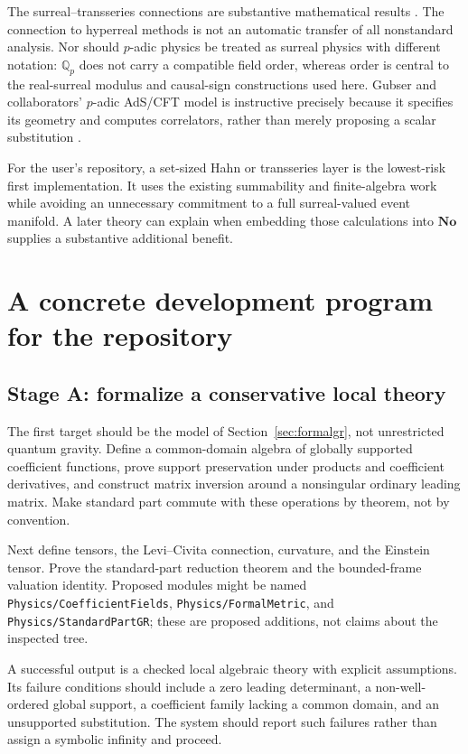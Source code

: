 \documentclass[11pt,a4paper]{article}
\numberwithin{equation}{section}
\theoremstyle{definition}
\theoremstyle{remark}
\newcommand{\No}{\mathbf{No}}
\newcommand{\Q}{\mathbb Q}
\begin{document}
The surreal--transseries connections are substantive mathematical results \cite{BM,ADH,CE}. The connection to hyperreal methods is not an automatic transfer of all nonstandard analysis. Nor should $p$-adic physics be treated as surreal physics with different notation: $\Q_p$ does not carry a compatible field order, whereas order is central to the real-surreal modulus and causal-sign constructions used here. Gubser and collaborators' $p$-adic AdS/CFT model is instructive precisely because it specifies its geometry and computes correlators, rather than merely proposing a scalar substitution \cite{Padic}.

For the user's repository, a set-sized Hahn or transseries layer is the lowest-risk first implementation. It uses the existing summability and finite-algebra work while avoiding an unnecessary commitment to a full surreal-valued event manifold. A later theory can explain when embedding those calculations into $\No$ supplies a substantive additional benefit.

\section{A concrete development program for the repository}
\label{sec:program}

\subsection{Stage A: formalize a conservative local theory}
The first target should be the model of Section~\ref{sec:formalgr}, not unrestricted quantum gravity. Define a common-domain algebra of globally supported coefficient functions, prove support preservation under products and coefficient derivatives, and construct matrix inversion around a nonsingular ordinary leading matrix. Make standard part commute with these operations by theorem, not by convention.

Next define tensors, the Levi--Civita connection, curvature, and the Einstein tensor. Prove the standard-part reduction theorem and the bounded-frame valuation identity. Proposed modules might be named \texttt{Physics/CoefficientFields}, \texttt{Physics/FormalMetric}, and \texttt{Physics/StandardPartGR}; these are proposed additions, not claims about the inspected tree.

A successful output is a checked local algebraic theory with explicit assumptions. Its failure conditions should include a zero leading determinant, a non-well-ordered global support, a coefficient family lacking a common domain, and an unsupported substitution. The system should report such failures rather than assign a symbolic infinity and proceed.
\end{document}
